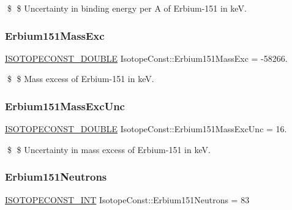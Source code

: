 \$ \$ Uncertainty in binding energy per A of Erbium-\/151 in keV. \mbox{\label{group___isotope_const-_erbium-_er151_gaad65f0a01d1cb60bead2738827e151b6}} 
\subsubsection{\texorpdfstring{Erbium151\+Mass\+Exc}{Erbium151MassExc}}
{\footnotesize\ttfamily \mbox{\hyperlink{group___isotope_const-_macros_ga8f45a7272ce02c0b4c65c44636ed719a}{I\+S\+O\+T\+O\+P\+E\+C\+O\+N\+S\+T\+\_\+\+D\+O\+U\+B\+LE}} Isotope\+Const\+::\+Erbium151\+Mass\+Exc = -\/58266.}

\$ \$ Mass excess of Erbium-\/151 in keV. \mbox{\label{group___isotope_const-_erbium-_er151_ga5e1824c3d80a27d0688bdf2b682cf31a}} 
\subsubsection{\texorpdfstring{Erbium151\+Mass\+Exc\+Unc}{Erbium151MassExcUnc}}
{\footnotesize\ttfamily \mbox{\hyperlink{group___isotope_const-_macros_ga8f45a7272ce02c0b4c65c44636ed719a}{I\+S\+O\+T\+O\+P\+E\+C\+O\+N\+S\+T\+\_\+\+D\+O\+U\+B\+LE}} Isotope\+Const\+::\+Erbium151\+Mass\+Exc\+Unc = 16.}

\$ \$ Uncertainty in mass excess of Erbium-\/151 in keV. \mbox{\label{group___isotope_const-_erbium-_er151_ga3f9974804b4c5e005ab739509f5ff448}} 
\subsubsection{\texorpdfstring{Erbium151\+Neutrons}{Erbium151Neutrons}}
{\footnotesize\ttfamily \mbox{\hyperlink{group___isotope_const-_macros_ga5f18360b3e99483a35c32d789e62621c}{I\+S\+O\+T\+O\+P\+E\+C\+O\+N\+S\+T\+\_\+\+I\+NT}} Isotope\+Const\+::\+Erbium151\+Neutrons = 83}

